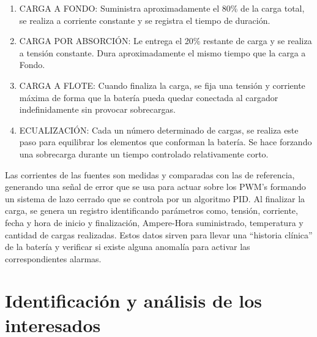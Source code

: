 \documentclass[11pt]{charter}
\begin{document}

\begin{enumerate}
\item CARGA A FONDO: Suministra aproximadamente el 80\% de la carga total, se realiza a corriente constante y se registra el tiempo de duración.
\item CARGA POR ABSORCIÓN: Le entrega el 20\% restante de carga y se realiza a tensión constante. Dura aproximadamente el mismo tiempo que la carga a Fondo.
\item CARGA A FLOTE: Cuando finaliza la carga, se fija una tensión y corriente máxima de forma que la batería pueda quedar conectada al cargador indefinidamente sin provocar sobrecargas.
\item ECUALIZACIÓN: Cada un número determinado de cargas, se realiza este paso para equilibrar los elementos que conforman la batería. Se hace forzando una sobrecarga durante un tiempo controlado relativamente corto.
\end{enumerate}

Las corrientes de las fuentes son medidas y comparadas con las de referencia, generando una señal de error que se usa para actuar sobre los PWM’s formando un sistema de lazo cerrado que se controla por un algoritmo PID.
Al finalizar la carga, se genera un registro identificando parámetros como, tensión, corriente, fecha y hora de inicio y finalización, Ampere-Hora suministrado, temperatura y cantidad de cargas realizadas. Estos datos sirven para llevar una “historia clínica” de la batería y verificar si existe alguna anomalía para activar las correspondientes alarmas.


\section{Identificación y análisis de los interesados}
\label{sec:interesados}
\end{document}

